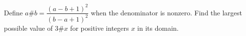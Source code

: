 Define $a\#b=\dfrac{(a-b+1)^2}{(b-a+1)^2}$ when the denominator is nonzero. Find the largest possible value of $3\#x$ for positive integers $x$ in its domain.
